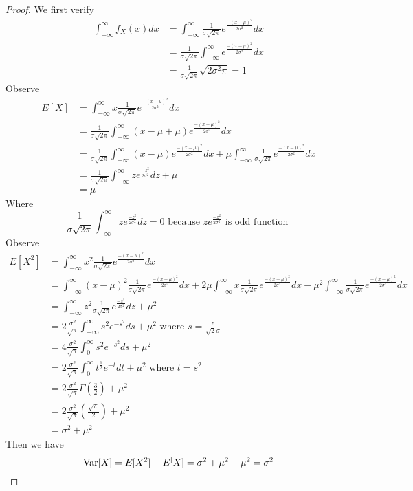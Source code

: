 \documentclass{report}
\begin{document}
\begin{proof}
We first verify 
\begin{align}
\int_{-\infty}^\infty f_X(x)dx&=\int_{-\infty}^\infty \frac{1}{\sigma \sqrt{2\pi} }e^{\frac{-(x-\mu)^2}{2\sigma^2}}dx\\
&=\frac{1}{\sigma \sqrt{2\pi} }\int_{-\infty}^\infty e^{\frac{-(x-\mu)^2}{2\sigma^2}}dx\\
&=\frac{1}{\sigma \sqrt{2\pi} } \sqrt{2\sigma^2 \pi}=1
\end{align}
Observe
\begin{align}
E[X]&=\int_{-\infty}^\infty x \frac{1}{\sigma \sqrt{2\pi} }e^{\frac{-(x-\mu)^2}{2\sigma^2}}dx\\
&=\frac{1}{\sigma \sqrt{2\pi} }\int_{-\infty}^\infty (x-\mu +\mu)e^{\frac{-(x-\mu)^2}{2\sigma^2}}dx\\
&=\frac{1}{\sigma \sqrt{2\pi} }\int_{-\infty}^\infty (x-\mu) e^{\frac{-(x-\mu)^2}{2\sigma^2}}dx + \mu\int_{-\infty}^\infty \frac{1}{\sigma \sqrt{2\pi} }e^{\frac{-(x-\mu)^2}{2\sigma^2}}dx\\
&=\frac{1}{\sigma \sqrt{2\pi} }\int_{-\infty}^\infty ze^{\frac{-z^2}{2\sigma^2}}dz+\mu\\
&=\mu
\end{align}
Where 
\begin{equation}
\frac{1}{\sigma \sqrt{2\pi} }\int_{-\infty}^\infty ze^{\frac{-z^2}{2\sigma^2}}dz=0\text{ because }ze^{\frac{-z^2}{2\sigma^2}}\text{ is odd function }
\end{equation}
Observe
\begin{align}
E[X^2]&=\int_{-\infty}^\infty x^2 \frac{1}{\sigma \sqrt{2\pi} } e^{\frac{-(x-\mu)^2}{2\sigma^2}}dx\\
      &=\int_{-\infty}^\infty (x-\mu)^2 \frac{1}{\sigma \sqrt{2\pi} }e^{\frac{-(x-\mu)^2}{2\sigma^2}}dx+2\mu \int_{-\infty}^\infty x \frac{1}{\sigma \sqrt{2\pi} }e^{\frac{-(x-\mu)^2}{2\sigma^2}}dx-\mu^2 \int_{-\infty}^\infty \frac{1}{\sigma \sqrt{2\pi} }e^{\frac{-(x-\mu)^2}{2\sigma^2}}dx\\
      &=\int_{-\infty}^\infty z^2 \frac{1}{\sigma\sqrt{2\pi} }e^{\frac{-z^2}{2\sigma^2}}dz+\mu^2\\
      &=2 \frac{\sigma^2}{\sqrt{\pi} }\int_{-\infty}^\infty s^2e^{-s^2}ds+\mu^2\text{ where }s=\frac{z}{\sqrt{2} \sigma}\\
      &=4 \frac{\sigma^2}{\sqrt{\pi} }\int_0^\infty s^2e^{-s^2}ds +\mu^2\\
      &=2 \frac{\sigma^2}{\sqrt{\pi} }\int_0^\infty t^{\frac{1}{2}} e^{-t}dt +\mu^2\text{ where }t=s^2\\
      &=2 \frac{\sigma^2}{\sqrt{\pi} }\Gamma(\frac{3}{2})+\mu^2\\
      &=2 \frac{\sigma^2}{\sqrt{\pi} } (\frac{\sqrt{\pi} }{2})+\mu^2\\
      &=\sigma^2+\mu^2
\end{align}
Then we have
\begin{equation}
\text{Var} [X]=E[X^2]-E^[X]=\sigma^2+\mu^2-\mu^2=\sigma^2
\end{equation}
\end{proof}
\end{document}

